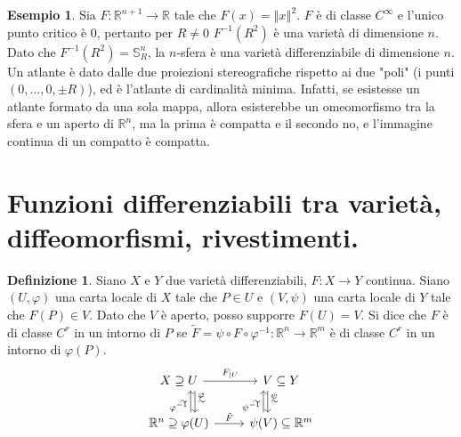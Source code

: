 \documentclass[a4paper,11pt]{article}
\theoremstyle{definition}
\newtheorem{definizione}{Definizione}[section]
\newtheorem{esempio}{Esempio}[section]
\theoremstyle{theorem}
\newcommand{\norm}[1]{\left\Vert#1\right\Vert}
\begin{document}
\begin{esempio}
	Sia $F\colon\mathbb{R}^{n+1}\to\mathbb{R}$ tale che $F(x)=\norm{x}^2$. $F$ è di classe $C^\infty$ e l'unico punto critico è 0, pertanto per $R\neq0$ $F^{-1}(R^2)$ è una varietà di dimensione $n$. Dato che $F^{-1}(R^2)=\mathbb{S}^n_R$, la $n$-sfera è una varietà differenziabile di dimensione $n$. Un atlante è dato dalle due proiezioni stereografiche rispetto ai due "poli" (i punti $(0,\dots,0,\pm R)$), ed è l'atlante di cardinalità minima. Infatti, se esistesse un atlante formato da una sola mappa, allora esisterebbe un omeomorfismo tra la sfera e un aperto di $\mathbb{R}^n$, ma la prima è compatta e il secondo no, e l'immagine continua di un compatto è compatta.
\end{esempio}
\newpage

\section{Funzioni differenziabili tra varietà, diffeomorfismi, rivestimenti.}
\begin{definizione}
	Siano $X$ e $Y$ due varietà differenziabili, $F\colon X\to Y$ continua. Siano $(U,\varphi)$ una carta locale di $X$ tale che $P\in U$ e $(V,\psi)$ una carta locale di $Y$ tale che $F(P)\in V$. Dato che $V$ è aperto, posso supporre $F(U)=V$. Si dice che $F$ è di classe $C^r$ in un intorno di $P$ se $\tilde{F}=\psi\circ F\circ\varphi^{-1}\colon\mathbb{R}^n\to\mathbb{R}^m$ è di classe $C^r$ in un intorno di $\varphi(P)$.
	\[\begin{tikzcd}
	X\supseteq U\arrow[r, "F_{|U}"]\arrow[d, "\sim", shift left=3ex, "\varphi" near start] & \arrow[d, "\sim", shift right=2.5ex, "\psi" near start] V\subseteq Y \\
	\mathbb{R}^n\supseteq\varphi(U)\arrow[r, "\tilde{F}"]\arrow[u, shift right=2.2ex, "\varphi^{-1}" near start, "\sim"] & \psi(V) \arrow[u, shift left=3.3ex, "\psi^{-1}" near start, "\sim"]\subseteq\mathbb{R}^m
	\end{tikzcd}\]
\end{definizione}
\end{document}
